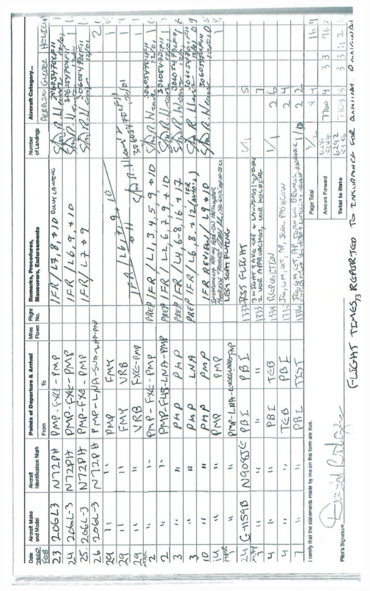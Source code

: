 \documentclass[10pt]{article}
\begin{document}
\includegraphics[max width=\textwidth, center]{2025_02_27_dd68c3d38de88f0516d9g-077}\\
\end{document}
